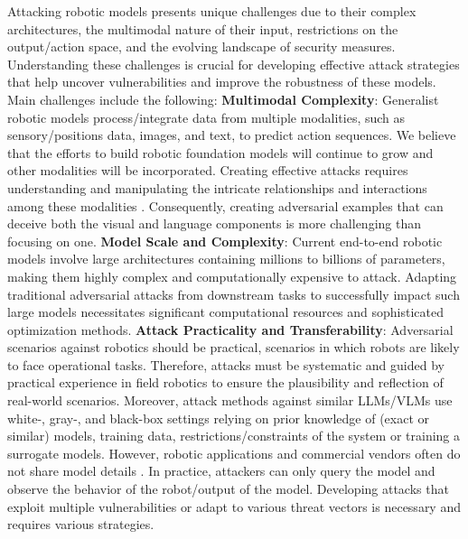 Attacking robotic models
presents unique challenges due to their complex architectures, the multimodal nature of their input, restrictions on the output/action space, and the evolving landscape of security measures. 
Understanding these challenges is crucial for developing effective attack strategies that help
uncover vulnerabilities and improve the robustness of these models. 
Main challenges include the following:
{} \textbf{{Multimodal Complexity}}: Generalist robotic models process/integrate data from multiple modalities, such as sensory/positions data, images, and text, to predict action sequences. We believe that the efforts to build robotic foundation models will continue to grow and other modalities will be incorporated.
    Creating effective attacks requires understanding and manipulating the intricate relationships and interactions among these modalities \cite{radford2021learning}. 
    Consequently, creating adversarial examples that can deceive both the visual and language components is more challenging than focusing on one. %
{} \textbf{{Model Scale and Complexity}}: Current end-to-end robotic models involve large architectures containing millions to billions of parameters, making them highly complex and computationally expensive to attack.
    Adapting traditional adversarial attacks from downstream tasks to successfully impact such large models necessitates significant computational resources and sophisticated optimization methods.
{} \textbf{{Attack Practicality and Transferability}}: 
    Adversarial scenarios against robotics should be practical, \ie scenarios in which robots are likely to face operational tasks. 
Therefore, attacks must be systematic and guided by practical experience in field robotics to ensure the plausibility and reflection of real-world scenarios. 
    Moreover, attack methods against similar LLMs/VLMs use white-, gray-, and black-box settings relying on prior knowledge of (exact or similar) models, training data, restrictions/constraints of the system or training a surrogate models. However, robotic applications and commercial vendors often do not share model details \cite{cheng2018query}. In practice, attackers can only query the model and observe the behavior of the robot/output of the model. Developing attacks that exploit multiple vulnerabilities \cite{biggio2018wild} or adapt to various threat vectors is necessary and requires various strategies.

